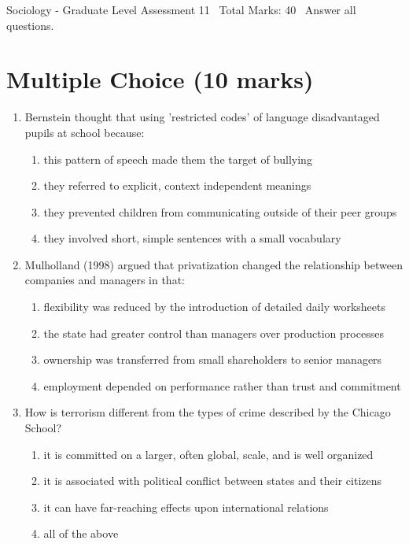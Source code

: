 \documentclass[12pt]{article}
\begin{document}
\begin{center}
Sociology - Graduate Level Assessment 11 \
Total Marks: 40 \
Answer all questions.
\end{center}

\section*{Multiple Choice (10 marks)}
\begin{enumerate}[label=\arabic*.]
\item Bernstein thought that using 'restricted codes' of language disadvantaged pupils at school because:
\begin{enumerate}[label=(\alph*)]
    \item this pattern of speech made them the target of bullying
    \item they referred to explicit, context independent meanings
    \item they prevented children from communicating outside of their peer groups
    \item they involved short, simple sentences with a small vocabulary
\end{enumerate}
\item Mulholland (1998) argued that privatization changed the relationship between companies and managers in that:
\begin{enumerate}[label=(\alph*)]
    \item flexibility was reduced by the introduction of detailed daily worksheets
    \item the state had greater control than managers over production processes
    \item ownership was transferred from small shareholders to senior managers
    \item employment depended on performance rather than trust and commitment
\end{enumerate}
\item How is terrorism different from the types of crime described by the Chicago School?
\begin{enumerate}[label=(\alph*)]
    \item it is committed on a larger, often global, scale, and is well organized
    \item it is associated with political conflict between states and their citizens
    \item it can have far-reaching effects upon international relations
    \item all of the above

\end{enumerate}
\end{enumerate}
\end{document}
